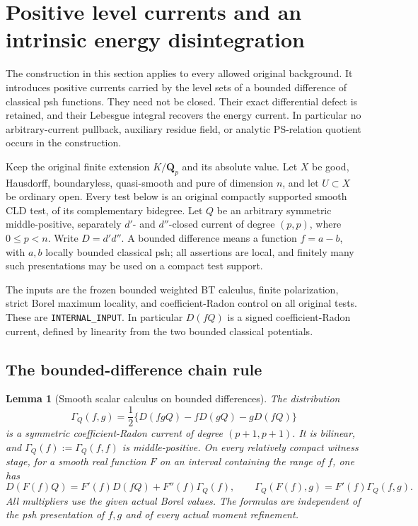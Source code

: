 \documentclass[11pt,a4paper]{article}
\numberwithin{equation}{section}
\newtheorem{lemma}[theorem]{Lemma}
\theoremstyle{definition}
\theoremstyle{remark}
\begin{document}
\section{Positive level currents and an intrinsic energy disintegration}
\label{sec:r11-level-disintegration}

The construction in this section applies to every allowed original
background.  It introduces positive currents carried by the level sets
of a bounded difference of classical psh functions.  They need not be
closed.  Their exact differential defect is retained, and their
Lebesgue integral recovers the energy current.  In particular no
arbitrary-current pullback, auxiliary residue field, or analytic
PS-relation quotient occurs in the construction.

Keep the original finite extension $K/\mathbf Q_p$ and its absolute
value.  Let $X$ be good, Hausdorff, boundaryless, quasi-smooth and pure
of dimension $n$, and let $U\subset X$ be ordinary open.  Every test
below is an original compactly supported smooth CLD test, of its
complementary bidegree.  Let $Q$ be an arbitrary symmetric
middle-positive, separately $d'$- and $d''$-closed current of degree
$(p,p)$, where $0\le p<n$.  Write $D=d'd''$.  A bounded difference
means a function $f=a-b$, with $a,b$ locally bounded classical psh;
all assertions are local, and finitely many such presentations may
be used on a compact test support.

The inputs are the frozen bounded weighted BT calculus, finite
polarization, strict Borel maximum locality, and coefficient-Radon
control on all original tests.  These are
\texttt{INTERNAL\_INPUT}.  In particular $D(fQ)$ is a signed
coefficient-Radon current, defined by linearity from the two bounded
classical potentials.

\subsection{The bounded-difference chain rule}

\begin{lemma}[Smooth scalar calculus on bounded differences]
\label{lem:r11-bounded-difference-chain}
The distribution
\[
 \Gamma_Q(f,g)
 =\frac12\{D(fgQ)-fD(gQ)-gD(fQ)\}
 \tag{LC1}
\]
is a symmetric coefficient-Radon current of degree $(p+1,p+1)$.
It is bilinear, and $\Gamma_Q(f):=\Gamma_Q(f,f)$ is
middle-positive.  On every relatively compact witness stage,
for a smooth real function $F$ on an interval containing the range
of $f$, one has
\[
 D(F(f)Q)=F'(f)D(fQ)+F''(f)\Gamma_Q(f),
 \qquad
 \Gamma_Q(F(f),g)=F'(f)\Gamma_Q(f,g).
 \tag{LC2}
\]
All multipliers use the given actual Borel values.  The formulas
are independent of the psh presentation of $f,g$ and of every
actual moment refinement.
\end{lemma}
\end{document}
